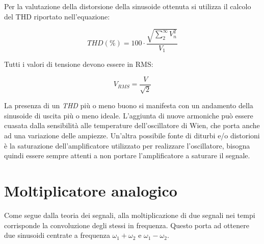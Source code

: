 \documentclass[titlepage]{report}
\begin{document}
	Per la valutazione della distorsione della sinusoide ottenuta si utilizza il calcolo del THD riportato nell'equazione:
	
	\begin{equation}
		\label{eq:thd}
		THD (\%) = 100 \cdot \frac{\sqrt{\sum_{2}^{\infty} V_{n}^2}}{V_1}
	\end{equation}

	Tutti i valori di tensione devono essere in RMS: 
	
	\begin{equation}
		\label{eq:Vrms}
		V_{RMS} = \frac{V}{\sqrt{2}}
	\end{equation}

	La presenza di un \textit{THD} più o meno buono si manifesta con un andamento della sinusoide di uscita più o meno ideale. L'aggiunta di nuove armoniche può essere cuasata dalla sensibilità alle temperature dell'oscillatore di Wien, che porta anche ad una variazione delle ampiezze. Un'altra possibile fonte di diturbi e/o distorioni è la saturazione dell'amplificatore utilizzato per realizzare l'oscillatore, bisogna quindi essere sempre attenti a non portare l'amplificatore a saturare il segnale.


	
	
		
\newpage
\section{Moltiplicatore analogico}
	Come segue dalla teoria dei segnali, alla moltiplicazione di due segnali nei tempi corrisponde la convoluzione degli stessi in frequenza. Questo porta ad ottenere due sinusoidi centrate a frequenza $\omega_1 + \omega_2$ e $\omega_1 - \omega_2$.
	
\end{document}
